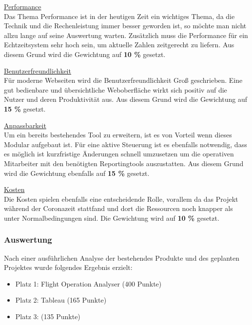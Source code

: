 		\vspace{8pt}

		{
			\noindent
			\underline{Performance}\\
			Das Thema Performance ist in der heutigen Zeit ein wichtiges Thema, da die Technik und die Rechenleistung immer besser geworden ist, so möchte man nicht allzu lange auf seine Auswertung warten. Zusätzlich muss die Performance für ein Echtzeitsystem sehr hoch sein, um aktuelle Zahlen zeitgerecht zu liefern. Aus diesem Grund wird die Gewichtung auf \textbf{10 \%} gesetzt.
		}

		\vspace{8pt}

		{
			\noindent
			\underline{Benutzerfreundlichkeit}\\
			Für moderne Webseiten wird die Benutzerfreundlichkeit Groß geschrieben. Eine gut bedienbare und übersichtliche Weboberfläche wirkt sich positiv auf die Nutzer und deren Produktivität aus. Aus diesem Grund wird die Gewichtung auf \textbf{15 \%} gesetzt.
		}

		\vspace{8pt}

		{
			\noindent
			\underline{Anpassbarkeit}\\
			Um ein bereits bestehendes Tool zu erweitern, ist es von Vorteil wenn dieses Modular aufgebaut ist. Für eine aktive Steuerung ist es ebenfalls notwendig, dass es möglich ist kurzfristige Änderungen schnell umzusetzen um die operativen Mitarbeiter mit den benötigten Reportingtools auszustatten. Aus diesem Grund wird die Gewichtung ebenfalls auf \textbf{15 \%} gesetzt.
		}

		\vspace{8pt}

		{
			\noindent
			\underline{Kosten}\\
			Die Kosten spielen ebenfalls eine entscheidende Rolle, vorallem da das Projekt während der Coronazeit stattfand und dort die Ressourcen noch knapper als unter Normalbedingungen sind. Die Gewichtung wird auf \textbf{10 \%} gesetzt.
		}

		\subsubsection{Auswertung}
		Nach einer ausführlichen Analyse der bestehendes Produkte und des geplanten Projektes wurde folgendes Ergebnis erzielt:

		\begin{itemize}
			\item Platz 1: Flight Operation Analyser (400 Punkte)
			\item Platz 2: Tableau (165 Punkte)
			\item Platz 3:  (135 Punkte)
		\end{itemize}


